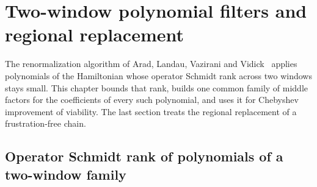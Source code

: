 \chapter{Two-window polynomial filters and regional replacement}
\label{ch:gapped_chain_polynomial_filters}

The renormalization algorithm of Arad, Landau, Vazirani and
Vidick~\cite{Arad2016RigorousRG} applies polynomials of the Hamiltonian
whose operator Schmidt rank across two windows stays small. This chapter
bounds that rank, builds one common family of middle factors for the
coefficients of every such polynomial, and uses it for Chebyshev
improvement of viability. The last section treats the regional replacement
of a frustration-free chain.

\section{Operator Schmidt rank of polynomials of a two-window family}

